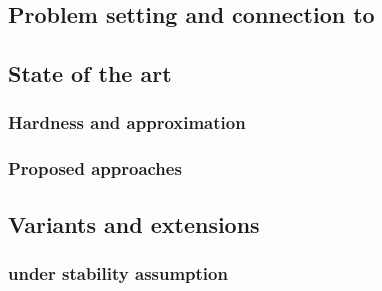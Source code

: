 \subsection{Problem setting and connection to \esp{}}
\label{sub:problem_setting}


\subsection{State of the art}
\label{sub:state_of_the_art}

\subsubsection{Hardness and approximation}
\label{ssub:cc_harness_approx}

\subsubsection{Proposed approaches}
\label{ssub:cc_methods}


\subsection{Variants and extensions}
\label{sub:variants_and_extensions}


\subsubsection{\pcc{} under stability assumption}
\label{ssub:cc_under_stability_assumption}

